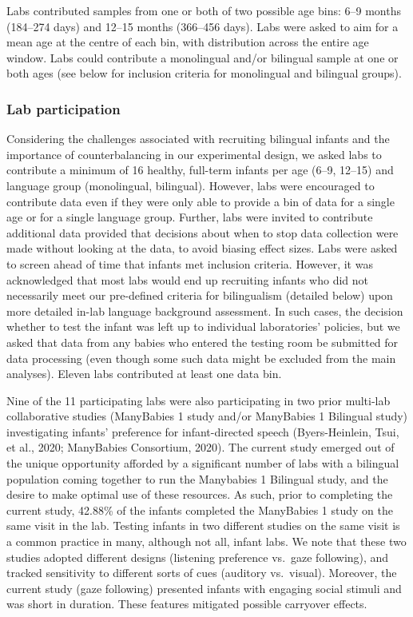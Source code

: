 \documentclass[
  english,
  ,man,floatsintext]{apa6}
\begin{document}
Labs contributed samples from one or both of two possible age bins: 6--9 months (184--274 days) and 12--15 months (366--456 days). Labs were asked to aim for a mean age at the centre of each bin, with distribution across the entire age window. Labs could contribute a monolingual and/or bilingual sample at one or both ages (see below for inclusion criteria for monolingual and bilingual groups).

\hypertarget{lab-participation}{%
\subsubsection{Lab participation}\label{lab-participation}}

Considering the challenges associated with recruiting bilingual infants and the importance of counterbalancing in our experimental design, we asked labs to contribute a minimum of 16 healthy, full-term infants per age (6--9, 12--15) and language group (monolingual, bilingual). However, labs were encouraged to contribute data even if they were only able to provide a bin of data for a single age or for a single language group. Further, labs were invited to contribute additional data provided that decisions about when to stop data collection were made without looking at the data, to avoid biasing effect sizes. Labs were asked to screen ahead of time that infants met inclusion criteria. However, it was acknowledged that most labs would end up recruiting infants who did not necessarily meet our pre-defined criteria for bilingualism (detailed below) upon more detailed in-lab language background assessment. In such cases, the decision whether to test the infant was left up to individual laboratories' policies, but we asked that data from any babies who entered the testing room be submitted for data processing (even though some such data might be excluded from the main analyses). Eleven labs contributed at least one data bin.

Nine of the 11 participating labs were also participating in two prior multi-lab collaborative studies (ManyBabies 1 study and/or ManyBabies 1 Bilingual study) investigating infants' preference for infant-directed speech (Byers-Heinlein, Tsui, et al., 2020; ManyBabies Consortium, 2020). The current study emerged out of the unique opportunity afforded by a significant number of labs with a bilingual population coming together to run the Manybabies 1 Bilingual study, and the desire to make optimal use of these resources. As such, prior to completing the current study, 42.88\% of the infants completed the ManyBabies 1 study on the same visit in the lab. Testing infants in two different studies on the same visit is a common practice in many, although not all, infant labs. We note that these two studies adopted different designs (listening preference vs.~gaze following), and tracked sensitivity to different sorts of cues (auditory vs.~visual). Moreover, the current study (gaze following) presented infants with engaging social stimuli and was short in duration. These features mitigated possible carryover effects.
\end{document}
